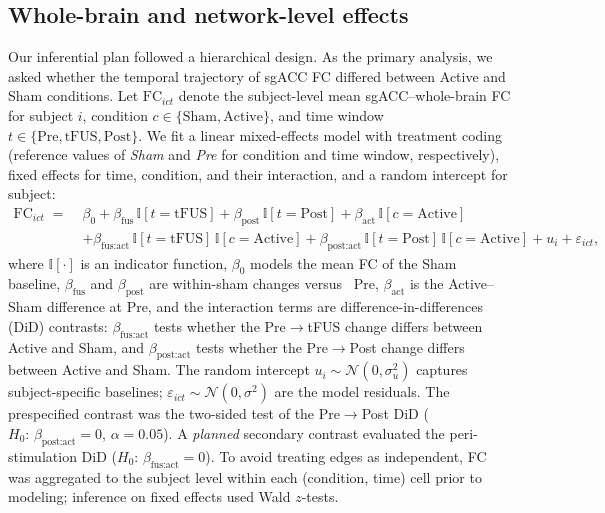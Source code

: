 \subsection*{Whole-brain and network-level effects}
\noindent
Our inferential plan followed a hierarchical design. As the primary analysis, we asked whether the temporal trajectory of sgACC FC differed between Active and Sham conditions. Let $\mathrm{FC}_{ict}$ denote the subject-level mean sgACC–whole-brain FC for subject $i$, condition $c\in\{\text{Sham},\text{Active}\}$, and time window $t\in\{\text{Pre},\text{tFUS},\text{Post}\}$. We fit a linear mixed-effects model with treatment coding (reference values of \emph{Sham} and \emph{Pre} for condition and time window, respectively), fixed effects for time, condition, and their interaction, and a random intercept for subject:
\[
\begin{aligned}
\mathrm{FC}_{ict} \;=\;& \beta_0
+ \beta_{\text{fus}}\,\mathbb{I}[t=\text{tFUS}]
+ \beta_{\text{post}}\,\mathbb{I}[t=\text{Post}]
+ \beta_{\text{act}}\,\mathbb{I}[c=\text{Active}]\\
&+ \beta_{\text{fus:act}}\,\mathbb{I}[t=\text{tFUS}]\,\mathbb{I}[c=\text{Active}]
+ \beta_{\text{post:act}}\,\mathbb{I}[t=\text{Post}]\,\mathbb{I}[c=\text{Active}]
+ u_i + \varepsilon_{ict},
\end{aligned}
\]
where $\mathbb{I}[\cdot]$ is an indicator function, $\beta_0$ models the mean FC of the Sham baseline, $\beta_{\text{fus}}$ and $\beta_{\text{post}}$ are within-sham changes versus \ Pre, $\beta_{\text{act}}$ is the Active–Sham difference at Pre, and the interaction terms are difference-in-differences (DiD) contrasts: $\beta_{\text{fus:act}}$ tests whether the Pre$\rightarrow$tFUS change differs between Active and Sham, and $\beta_{\text{post:act}}$ tests whether the Pre$\rightarrow$Post change differs between Active and Sham. The random intercept $u_i\sim\mathcal{N}(0,\sigma_u^2)$ captures subject-specific baselines; $\varepsilon_{ict}\sim\mathcal{N}(0,\sigma^2)$ are the model residuals. The prespecified contrast was the two-sided test of the Pre$\rightarrow$Post DiD ($H_0\!:\,\beta_{\text{post:act}}=0$, $\alpha=0.05$). A \emph{planned} secondary contrast evaluated the peri-stimulation DiD ($H_0\!:\,\beta_{\text{fus:act}}=0$). To avoid treating edges as independent, FC was aggregated to the subject level within each (condition, time) cell prior to modeling; inference on fixed effects used Wald $z$-tests.

